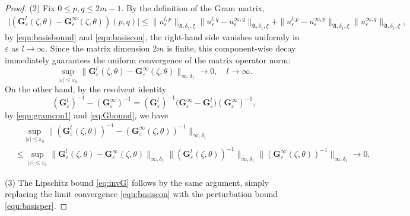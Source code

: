 \documentclass[reqno,11pt]{amsart}
\begin{document}
\begin{proof}
(2)  Fix $0\le p,q\le 2m-1$. By the definition of the Gram matrix,
$$
\begin{aligned}
\big|(\mathbf G_\varepsilon^l(\zeta,\theta)-\mathbf G_\varepsilon^\infty(\zeta,\theta))(p,q)\big| 
\leq  \|u_\varepsilon^{l,p}\|_{\mathfrak A,\delta_1,\xi} \|u_\varepsilon^{l,q} - u_\varepsilon^{\infty,q}\|_{\mathfrak A,\delta_1,\xi}  + \|u_\varepsilon^{l,p} - u_\varepsilon^{\infty,p}\|_{\mathfrak A,\delta_1,\xi} \|u_\varepsilon^{\infty,q}\|_{\mathfrak A,\delta_1,\xi},
\end{aligned}
$$
by \eqref{equ:basisbound} and \eqref{equ:basiscon}, 
the right-hand side vanishes uniformly in $\varepsilon$ as $l \to \infty$. Since the matrix dimension $2m$ is finite, this component-wise decay immediately guarantees the uniform convergence of the matrix operator norm: 
\begin{equation}\label{equ:gramcon1}
   \sup_{|\varepsilon|\le \varepsilon_a} \|\mathbf G_\varepsilon^l(\zeta,\theta)-\mathbf G_\varepsilon^\infty(\zeta,\theta)\|_{\infty,\delta_1}\to 0,\quad l\to\infty.
\end{equation}
On the other hand, by the resolvent identity
$$
(\mathbf{G}_\varepsilon^l)^{-1} - (\mathbf{G}_\varepsilon^\infty)^{-1} 
= (\mathbf{G}_\varepsilon^l)^{-1} \bigl( \mathbf{G}_\varepsilon^\infty - \mathbf{G}_\varepsilon^l \bigr) (\mathbf{G}_\varepsilon^\infty)^{-1},
$$
by  \eqref{equ:gramcon1} and \eqref{eq:Gbound}, we have
$$
\begin{aligned}
     &\quad\sup_{|\varepsilon|\le \varepsilon_a}\bigl\|
(\mathbf G_\varepsilon^l(\zeta,\theta))^{-1}-
(\mathbf G_\varepsilon^\infty(\zeta,\theta))^{-1}
\bigr\|_{\infty,\delta_1}\\
&
\le \sup_{|\varepsilon|\le \varepsilon_a}
\|\mathbf G_\varepsilon^l(\zeta,\theta)-\mathbf G_\varepsilon^\infty(\zeta,\theta)\|_{\infty,\delta_1}
\|(\mathbf G_\varepsilon^l(\zeta,\theta))^{-1}\|_{\infty,\delta_1}
\|(\mathbf G_\varepsilon^\infty(\zeta,\theta))^{-1}\|_{\infty,\delta_1}
\to 0.
\end{aligned}
$$

(3) The Lipschitz bound \eqref{eq:invG} follows by the same argument, simply replacing the limit convergence \eqref{equ:basiscon} with the perturbation bound \eqref{equ:basisper}. \qedhere


\end{proof}


\smallskip
\end{document}
